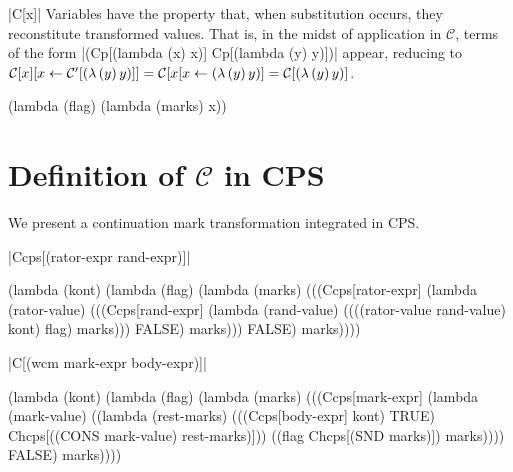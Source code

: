 \begin{schemedefinition}{\scheme|C[x]|}
\noindent
Variables have the property that, when substitution occurs, they reconstitute transformed values. That is, in the midst of application in $\mathcal{C}$, terms of the form \scheme|(Cp[(lambda (x) x)] Cp[(lambda (y) y)])| appear, reducing to $\mathcal{C}[x][x\leftarrow \mathcal{C}'[(\lambda\,(y)\,y)]]=\mathcal{C}[x[x\leftarrow(\lambda\,(y)\,y)]=\mathcal{C}[(\lambda\,(y)\,y)]$.
\begin{schemeblock}
\begin{schemedisplay}
(lambda (flag)
  (lambda (marks)
    x))
\end{schemedisplay}
\end{schemeblock}
\end{schemedefinition}

\section{Definition of $\mathcal{C}$ in CPS}

We present a continuation mark transformation integrated in CPS.

\begin{schemedefinition}{\scheme|Ccps[(rator-expr rand-expr)]|}
\begin{schemeblock}
\begin{schemedisplay}
(lambda (kont)
   (lambda (flag)
     (lambda (marks)
       (((Ccps[rator-expr]
          (lambda (rator-value)
            (((Ccps[rand-expr]
               (lambda (rand-value)
                 ((((rator-value rand-value) kont) flag) marks)))
              FALSE) marks)))
         FALSE) marks))))
\end{schemedisplay}
\end{schemeblock}
\end{schemedefinition}

\begin{schemedefinition}{\scheme|C[(wcm mark-expr body-expr)]|}
\begin{schemeblock}
\begin{schemedisplay}
(lambda (kont)
  (lambda (flag)
    (lambda (marks)
      (((Ccps[mark-expr]
          (lambda (mark-value) 
            ((lambda (rest-marks) 
               (((Ccps[body-expr] kont) TRUE) Chcps[((CONS mark-value) rest-marks)]))
             ((flag Chcps[(SND marks)]) marks))))
        FALSE) marks))))
\end{schemedisplay}
\end{schemeblock}
\end{schemedefinition}


